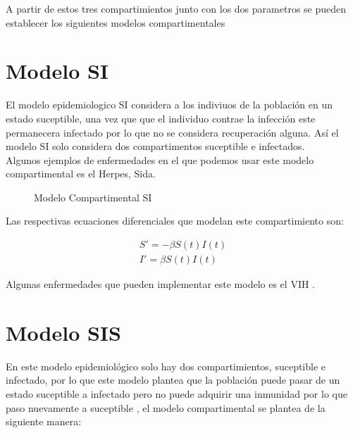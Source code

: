 \documentclass[a4paper,openany,12pt]{book}
\begin{document}
A partir de estos tres compartimientos junto con los dos parametros se pueden establecer los siguientes modelos compartimentales \cite{Brauer}

\section{Modelo SI}

El modelo epidemiologico SI considera a los indiviuos de la población en un estado suceptible, una vez que que el individuo contrae la infección este permanecera infectado por lo que no se considera recuperación alguna. Así el modelo SI solo considera dos compartimentos suceptible e infectados.\\ 

Algunos ejemplos de enfermedades en el que podemos usar este modelo compartimental es el Herpes, Sida.\\

\begin{figure}[h]
\centering
{}
\caption{Modelo Compartimental SI} \label{fig:Compartimento SI}
\end{figure}	

Las respectivas ecuaciones diferenciales que modelan este compartimiento son: 

\begin{align}
S' =  -\beta S\left(t\right)I\left(t\right) \\
I' = \beta S\left(t\right)I\left(t\right)
\end{align}

Algunas enfermedades que pueden implementar este modelo es el VIH \cite{enfInf}.

\section{Modelo SIS}

En este modelo epidemiológico  solo hay dos compartimientos, suceptible e infectado, por lo que este modelo plantea que la población puede pasar de un estado suceptible a infectado pero no puede adquirir una inmunidad por lo que paso nuevamente a suceptible , el modelo compartimental se plantea de la siguiente manera:\\
\end{document}
